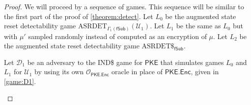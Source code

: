 \begin{proof}
We will proceed by a sequence of games. This sequence will be similar to the first part of the proof of \autoref{theorem:detect}. Let $L_0$ be the augmented state reset detectability game $\mathrm{ASRDET}_{\Gamma_1(\mathsf{fSub})}(\mathcal{U}_1)$. Let $L_1$ be the same as $L_0$ but with $\mu'$ sampled randomly instead of computed as an encryption of $\mu$. Let $L_2$ be the augmented state reset detectability game $\mathrm{ASRDET}\$_{\mathsf{fSub}}$.

Let $\mathcal{D}_1$ be an adversary to the IND\$ game for $\mathsf{PKE}$ that simulates games $L_0$ and $L_1$ for $\mathcal{U}_1$ by using its own $\mathcal{O}_\mathsf{PKE.Enc}$ oracle in place of $\mathsf{PKE.Enc}$, given in \autoref{game:D1}.

\begin{figure}
\centering
\begin{pchstack}
\begin{pcvstack}
\pcvspace
{}
\end{pcvstack}
\pchspace
\begin{pcvstack}
\end{pcvstack}
\end{pchstack}
\end{figure}
\end{proof}
